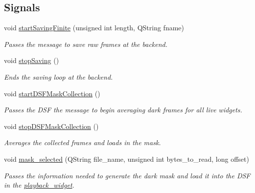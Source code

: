 \subsection*{Signals}
\begin{DoxyCompactItemize}
\item 
void \hyperlink{classControlsBox_ad18a240a7acdf8138ea9b8b97f1f629e}{start\+Saving\+Finite} (unsigned int length, Q\+String fname)
\begin{DoxyCompactList}\small\item\em Passes the message to save raw frames at the backend. \end{DoxyCompactList}\item 
\hypertarget{classControlsBox_a493ba8b77f7b521021524920a3f1bcf3}{void \hyperlink{classControlsBox_a493ba8b77f7b521021524920a3f1bcf3}{stop\+Saving} ()}\label{classControlsBox_a493ba8b77f7b521021524920a3f1bcf3}

\begin{DoxyCompactList}\small\item\em Ends the saving loop at the backend. \end{DoxyCompactList}\item 
\hypertarget{classControlsBox_a764644f969998d3d701af67706ddc9ca}{void \hyperlink{classControlsBox_a764644f969998d3d701af67706ddc9ca}{start\+D\+S\+F\+Mask\+Collection} ()}\label{classControlsBox_a764644f969998d3d701af67706ddc9ca}

\begin{DoxyCompactList}\small\item\em Passes the D\+S\+F the message to begin averaging dark frames for all live widgets. \end{DoxyCompactList}\item 
\hypertarget{classControlsBox_aac0037d12d7e27afcafdd651e9926551}{void \hyperlink{classControlsBox_aac0037d12d7e27afcafdd651e9926551}{stop\+D\+S\+F\+Mask\+Collection} ()}\label{classControlsBox_aac0037d12d7e27afcafdd651e9926551}

\begin{DoxyCompactList}\small\item\em Averages the collected frames and loads in the mask. \end{DoxyCompactList}\item 
\hypertarget{classControlsBox_a0c4847caef53224f76b02afe1202b233}{void \hyperlink{classControlsBox_a0c4847caef53224f76b02afe1202b233}{mask\+\_\+selected} (Q\+String file\+\_\+name, unsigned int bytes\+\_\+to\+\_\+read, long offset)}\label{classControlsBox_a0c4847caef53224f76b02afe1202b233}

\begin{DoxyCompactList}\small\item\em Passes the information needed to generate the dark mask and load it into the D\+S\+F in the \hyperlink{classplayback__widget}{playback\+\_\+widget}. \end{DoxyCompactList}\end{DoxyCompactItemize}
